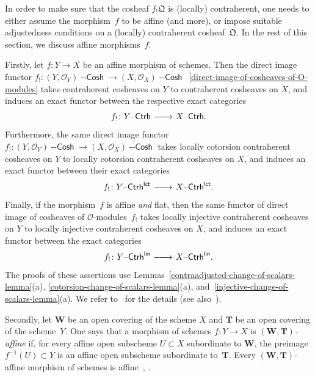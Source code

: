 \documentclass[12pt,a4paper]{amsart}
\newcommand{\+}{\nobreakdash-}
\renewcommand{\:}{\colon}
\newcommand{\rarrow}{\longrightarrow}
\newcommand{\lrarrow}{\mskip.5\thinmuskip\relbar\joinrel\relbar
   \joinrel\rightarrow\mskip.5\thinmuskip\relax}
\newcommand{\Ctrh}{{\operatorname{\mathsf{--Ctrh}}}}
\newcommand{\Cosh}{{\operatorname{\mathsf{--Cosh}}}}
\newcommand{\lct}{\mathsf{lct}}
\newcommand{\lin}{\mathsf{lin}}
\newcommand{\bW}{\mathbf W}
\newcommand{\bT}{\mathbf T}
\newcommand{\cO}{\mathcal O}
\newcommand{\fQ}{\mathfrak Q}
\theoremstyle{plain}
\theoremstyle{definition}
\begin{document}
 In order to make sure that the cosheaf $f_!\fQ$ is (locally)
contraherent, one needs to either assume the morphism~$f$ to be
affine (and more), or impose suitable adjustedness conditions
on a (locally) contraherent cosheaf~$\fQ$.
 In the rest of this section, we discuss affine morphisms~$f$.

 Firstly, let $f\:Y\rarrow X$ be an affine morphism of schemes.
 Then the direct image functor
$f_!\:(Y,\cO_Y)\Cosh\rarrow(X,\cO_X)\Cosh$
\,\eqref{direct-image-of-cosheaves-of-O-modules}
takes contraherent cosheaves on $Y$ to contraherent cosheaves on $X$,
and induces an exact functor between the respective exact categories
\begin{equation} \label{ctrh-direct-image}
 f_!\:Y\Ctrh\lrarrow X\Ctrh.
\end{equation}
 Furthermore, the same direct image functor
$f_!\:(Y,\cO_Y)\Cosh\rarrow(X,\cO_X)\Cosh$ takes locally cotorsion
contraherent cosheaves on $Y$ to locally cotorsion contraherent
cosheaves on $X$, and induces an exact functor between their exact
categories
\begin{equation} \label{ctrh-lct-direct-image}
 f_!\:Y\Ctrh^\lct\lrarrow X\Ctrh^\lct.
\end{equation}
 Finally, if the morphism~$f$ is affine \emph{and} flat,
then the same functor of direct image of cosheaves of
$\cO$\+modules~$f_!$ takes locally injective contraherent cosheaves
on $Y$ to locally injective contraherent cosheaves on $X$, and induces
an exact functor between the exact categories
\begin{equation} \label{ctrh-lin-direct-image}
 f_!\:Y\Ctrh^\lin\lrarrow X\Ctrh^\lin.
\end{equation}
 The proofs of these assertions use
Lemmas~\ref{contraadjusted-change-of-scalars-lemma}(a),
\ref{cotorsion-change-of-scalars-lemma}(a),
and~\ref{injective-change-of-scalars-lemma}(a).
 We refer to~\cite[Section~2.3]{Pcosh} for the details
(see also~\cite[Section~2.4]{Pdomc}).

 Secondly, let $\bW$ be an open covering of the scheme $X$ and $\bT$
be an open covering of the scheme~$Y$.
 One says that a morphism of schemes $f\:Y\rarrow X$ is
\emph{$(\bW,\bT)$\+affine} if, for every affine open subscheme
$U\subset X$ subordinate to $\bW$, the preimage $f^{-1}(U)\subset Y$
is an affine open subscheme subordinate to~$\bT$.
 Every $(\bW,\bT)$\+affine morphism of schemes is
affine~\cite[D\'efinition~II.1.2.1 and Corollaire~II.1.3.2]{EGAII},
\cite[Lemma Tag~01S8]{SP}.
\end{document}
